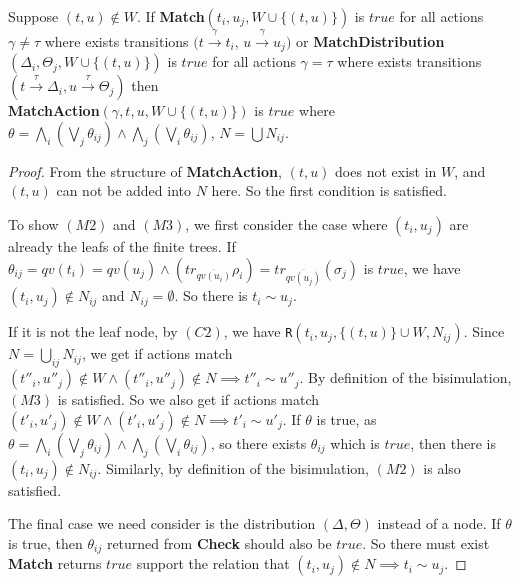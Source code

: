 \documentclass[a4paper,UKenglish,cleveref, autoref]{lipics-v2019}
\begin{document}
\begin{proposition} Suppose $(t,u)\notin W$.
	If \textbf{Match}$(t_i,u_j,W\cup\{(t,u)\})$ is $true$ for all actions $\gamma\neq\tau$ where exists transitions $(t\xrightarrow{\gamma}t_i$, $u\xrightarrow{\gamma}u_j)$ or \textbf{MatchDistribution}$(\Delta_i,\Theta_j,W\cup\{(t,u)\})$ is $true$ for all actions $\gamma=\tau$ where exists transitions $(t\xrightarrow{\tau}\Delta_i,u\xrightarrow{\tau}\Theta_j)$ then\\
	\textbf{MatchAction}$(\gamma,t,u,W\cup\{(t,u)\})$ is $true$ where
	$\theta=\bigwedge_i(\bigvee_j\theta_{ij})\wedge\bigwedge_j(\bigvee_i\theta_{ij})$, $N=\bigcup N_{ij}$.
\end{proposition}
\begin{proof}
	From the structure of \textbf{MatchAction}, $(t,u)$ does not exist in $W$, and $(t,u)$ can not be added into $N$ here. So the first condition is satisfied.
	
	To show $(M2)$ and $(M3)$, we first consider the case where $(t_i,u_j)$ are already the leafs of the finite trees. If $\theta_{ij}=qv(t_i)=qv(u_j)\wedge(tr_{\overline{qv(u_i)}}\rho_i)=tr_{\overline{qv(u_j)}}(\sigma_j)$ is $true$, we have $(t_i,u_j)\notin N_{ij}$ and $N_{ij}=\emptyset$. So there is $t_i\sim u_j$.
	
	If it is not the leaf node, by $(C2)$, we have \texttt{R}$(t_i,u_j,\{(t,u)\}\cup W,N_{ij})$. Since  $N=\bigcup_{ij}N_{ij}$, we get if actions match $(t''_i,u''_j)\notin W\wedge(t''_i,u''_j)\notin N\implies t''_i\sim u''_j$. By definition of the bisimulation, $(M3)$ is satisfied. So we also get if actions match $(t'_i,u'_j)\notin W\wedge(t'_i,u'_j)\notin N\implies t'_i\sim u'_j$. If $\theta$ is true, as $\theta=\bigwedge_i(\bigvee_j\theta_{ij})\wedge\bigwedge_j(\bigvee_i\theta_{ij})$, so there exists $\theta_{ij}$ which is $true$, then there is $(t_i,u_j)\notin N_{ij}$. Similarly, by definition of the bisimulation, $(M2)$ is also satisfied.
	
	The final case we need consider is the distribution $(\Delta,\Theta)$ instead of a node. If $\theta$ is true, then $\theta_{ij}$ returned from \textbf{Check} should also be $true$. So there must exist \textbf{Match} returns $true$ support the relation that $(t_i,u_j)\notin N\implies t_i\sim u_j$.
\end{proof}
\end{document}
